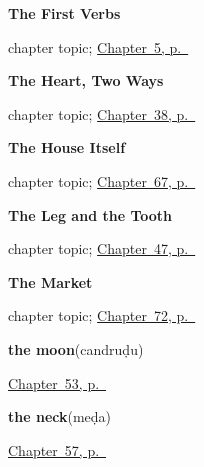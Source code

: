 \noindent\begin{minipage}[t]{\linewidth}
\raggedright
\textbf{The First Verbs}\par
\footnotesize chapter topic; \hyperref[ch:first-verbs]{Chapter~5, p.~\pageref*{ch:first-verbs}}
\end{minipage}\par\smallskip

\noindent\begin{minipage}[t]{\linewidth}
\raggedright
\textbf{The Heart, Two Ways}\par
\footnotesize chapter topic; \hyperref[ch:te-heart]{Chapter~38, p.~\pageref*{ch:te-heart}}
\end{minipage}\par\smallskip

\noindent\begin{minipage}[t]{\linewidth}
\raggedright
\textbf{The House Itself}\par
\footnotesize chapter topic; \hyperref[ch:te-the-house-itself]{Chapter~67, p.~\pageref*{ch:te-the-house-itself}}
\end{minipage}\par\smallskip

\noindent\begin{minipage}[t]{\linewidth}
\raggedright
\textbf{The Leg and the Tooth}\par
\footnotesize chapter topic; \hyperref[ch:te-body-more]{Chapter~47, p.~\pageref*{ch:te-body-more}}
\end{minipage}\par\smallskip

\noindent\begin{minipage}[t]{\linewidth}
\raggedright
\textbf{The Market}\par
\footnotesize chapter topic; \hyperref[ch:te-the-market]{Chapter~72, p.~\pageref*{ch:te-the-market}}
\end{minipage}\par\smallskip

\noindent\begin{minipage}[t]{\linewidth}
\raggedright
\textbf{the moon}\enspace\emph{}\enspace(candruḍu)\par
\footnotesize \hyperref[ch:te-sky]{Chapter~53, p.~\pageref*{ch:te-sky}}
\end{minipage}\par\smallskip

\noindent\begin{minipage}[t]{\linewidth}
\raggedright
\textbf{the neck}\enspace\emph{}\enspace(meḍa)\par
\footnotesize \hyperref[ch:te-more-body]{Chapter~57, p.~\pageref*{ch:te-more-body}}
\end{minipage}\par\smallskip

